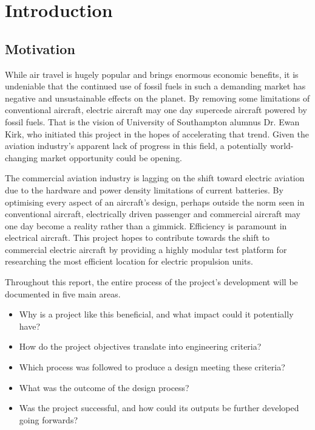 \documentclass[../../main.tex]{subfiles}
\begin{document}
\chapter{Introduction} \label{chapter:introduction}

\section{Motivation} \label{sec:introduction:motivation}

While air travel is hugely popular and brings enormous economic benefits, it is undeniable that the continued use of fossil fuels in such a demanding market has negative and unsustainable effects on the planet.
By removing some limitations of conventional aircraft, electric aircraft may one day supercede aircraft powered by fossil fuels.
That is the vision of University of Southampton alumnus Dr. Ewan Kirk, who initiated this project in the hopes of accelerating that trend.
Given the aviation industry's apparent lack of progress in this field, a potentially world-changing market opportunity could be opening.

The commercial aviation industry is lagging on the shift toward electric aviation due to the hardware and power density limitations of current batteries.
By optimising every aspect of an aircraft's design, perhaps outside the norm seen in conventional aircraft, electrically driven passenger and commercial aircraft may one day become a reality rather than a gimmick.
Efficiency is paramount in electrical aircraft.
This project hopes to contribute towards the shift to commercial electric aircraft by providing a highly modular test platform for researching the most efficient location for electric propulsion units. 

Throughout this report, the entire process of the project's development will be documented in five main areas.

\begin{itemize}
    \item Why is a project like this beneficial, and what impact could it potentially have?
    \item How do the project objectives translate into engineering criteria?
    \item Which process was followed to produce a design meeting these criteria?
    \item What was the outcome of the design process?
    \item Was the project successful, and how could its outputs be further developed going forwards?
\end{itemize}
\end{document}
